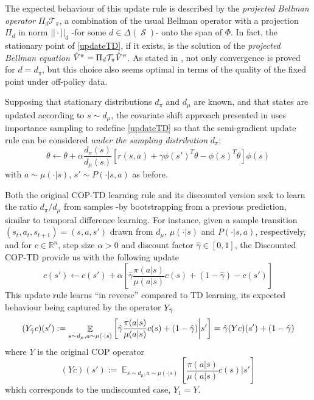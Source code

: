 \documentclass[12pt,a4paper,openright,twoside]{article}
\DeclareMathOperator*{\E}{\mathbb{E}}
\DeclareMathOperator*{\Sspace}{\mathcal{S}}
\numberwithin{equation}{section}
\theoremstyle{definition}
\theoremstyle{remark}
\theoremstyle{plain}
\begin{document}
The expected behaviour of this update rule is described by the \textit{projected Bellman operator} $\Pi_d \mathcal{T}_\pi$, a combination of the usual Bellman operator with a projection $\Pi_d$ in norm $||\cdot||_d$ -for some $d\in\Delta(\Sspace)$- onto the span of $\Phi$\cite{projectedBellman}. In fact, the stationary point of \ref{updateTD}, if it exists, is the solution of the \textit{projected Bellman equation} $\Hat{V}^\pi = \Pi_d \mathcal{T}_\pi \Hat{V}^\pi$. As stated in \cite{DCOPTD}, not only convergence is proved for $d=d_\pi$, but this choice also seems optimal in terms of the quality of the fixed point under off-policy data.

Supposing that stationary distributions $d_\pi$ and $d_\mu$ are known, and that states are updated according to $s\sim d_\mu$, the covariate shift approach presented in \cite{COPTD} uses importance sampling to redefine \ref{updateTD} so that the semi-gradient update rule can be considered \textit{under the sampling distribution} $d_\pi$:
\begin{equation} \label{updateTDimportance}
    \theta \leftarrow \theta + \alpha \frac{d_\pi(s)}{d_\mu (s)}\left[ r(s,a) + \gamma\phi(s')^T \theta - \phi(s)^T \theta \right] \phi(s)
\end{equation}
with $a\sim \mu(\cdot|s)$, $s' \sim P(\cdot|s,a)$ as before. 

Both the original COP-TD learning rule\cite{COPTD} and its discounted version\cite{DCOPTD} seek to learn the ratio $d_\pi / d_\mu$ from samples -by bootstrapping from a previous prediction, similar to temporal difference learning. For instance, given a sample transition $(s_t,a_t,s_{t+1}) = (s,a,s')$ drawn from $d_\mu$, $\mu(\cdot|s)$ and $P(\cdot|s,a)$, respectively, and for $c\in \mathbb{R}^n$, step size $\alpha>0$ and discount factor $\hat{\gamma} \in [0,1]$, the Discounted COP-TD provide us with the following update
\begin{equation} \label{DCOP}
    c(s') \leftarrow c(s') + \alpha \left[\hat{\gamma} \frac{\pi(a|s)}{\mu(a|s)}c(s) + (1-\hat{\gamma}) - c(s') \right]
\end{equation}
This update rule learns “in reverse” compared to TD learning, its expected behaviour being captured by the operator $Y_{\Hat{\gamma}}$
\begin{equation} \label{DCOPoperator}
    (Y_{\Hat{\gamma}}c)(s') := \E_{s \sim d_\mu, a \sim \mu(\cdot|s)} \left[ \hat{\gamma} \frac{\pi(a|s)}{\mu(a|s)}c(s) + (1-\hat{\gamma}) \bigg| s' \right] = \hat{\gamma} (Yc)(s') + (1-\hat{\gamma})
\end{equation}
where $Y$ is the original COP operator 
\begin{equation} \label{COPoperator}
    (Yc)(s') := \E_{s \sim d_\mu, a \sim \mu(\cdot|s)} \left[ \frac{\pi(a|s)}{\mu(a|s)}c(s)  \bigg| s' \right]
\end{equation}
which corresponds to the undiscounted case, $Y_1=Y$.
\end{document}
